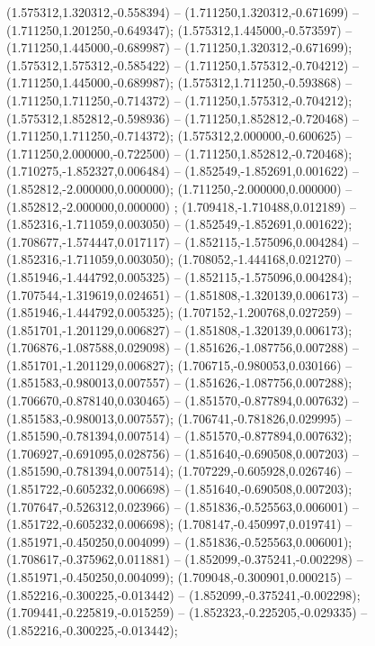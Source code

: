  (1.575312,1.320312,-0.558394) -- (1.711250,1.320312,-0.671699) -- (1.711250,1.201250,-0.649347);
 (1.575312,1.445000,-0.573597) -- (1.711250,1.445000,-0.689987) -- (1.711250,1.320312,-0.671699);
 (1.575312,1.575312,-0.585422) -- (1.711250,1.575312,-0.704212) -- (1.711250,1.445000,-0.689987);
 (1.575312,1.711250,-0.593868) -- (1.711250,1.711250,-0.714372) -- (1.711250,1.575312,-0.704212);
 (1.575312,1.852812,-0.598936) -- (1.711250,1.852812,-0.720468) -- (1.711250,1.711250,-0.714372);
 (1.575312,2.000000,-0.600625) -- (1.711250,2.000000,-0.722500) -- (1.711250,1.852812,-0.720468);
 (1.710275,-1.852327,0.006484) -- (1.852549,-1.852691,0.001622) -- (1.852812,-2.000000,0.000000);
 (1.711250,-2.000000,0.000000) -- (1.852812,-2.000000,0.000000) ;
 (1.709418,-1.710488,0.012189) -- (1.852316,-1.711059,0.003050) -- (1.852549,-1.852691,0.001622);
 (1.708677,-1.574447,0.017117) -- (1.852115,-1.575096,0.004284) -- (1.852316,-1.711059,0.003050);
 (1.708052,-1.444168,0.021270) -- (1.851946,-1.444792,0.005325) -- (1.852115,-1.575096,0.004284);
 (1.707544,-1.319619,0.024651) -- (1.851808,-1.320139,0.006173) -- (1.851946,-1.444792,0.005325);
 (1.707152,-1.200768,0.027259) -- (1.851701,-1.201129,0.006827) -- (1.851808,-1.320139,0.006173);
 (1.706876,-1.087588,0.029098) -- (1.851626,-1.087756,0.007288) -- (1.851701,-1.201129,0.006827);
 (1.706715,-0.980053,0.030166) -- (1.851583,-0.980013,0.007557) -- (1.851626,-1.087756,0.007288);
 (1.706670,-0.878140,0.030465) -- (1.851570,-0.877894,0.007632) -- (1.851583,-0.980013,0.007557);
 (1.706741,-0.781826,0.029995) -- (1.851590,-0.781394,0.007514) -- (1.851570,-0.877894,0.007632);
 (1.706927,-0.691095,0.028756) -- (1.851640,-0.690508,0.007203) -- (1.851590,-0.781394,0.007514);
 (1.707229,-0.605928,0.026746) -- (1.851722,-0.605232,0.006698) -- (1.851640,-0.690508,0.007203);
 (1.707647,-0.526312,0.023966) -- (1.851836,-0.525563,0.006001) -- (1.851722,-0.605232,0.006698);
 (1.708147,-0.450997,0.019741) -- (1.851971,-0.450250,0.004099) -- (1.851836,-0.525563,0.006001);
 (1.708617,-0.375962,0.011881) -- (1.852099,-0.375241,-0.002298) -- (1.851971,-0.450250,0.004099);
 (1.709048,-0.300901,0.000215) -- (1.852216,-0.300225,-0.013442) -- (1.852099,-0.375241,-0.002298);
 (1.709441,-0.225819,-0.015259) -- (1.852323,-0.225205,-0.029335) -- (1.852216,-0.300225,-0.013442);
